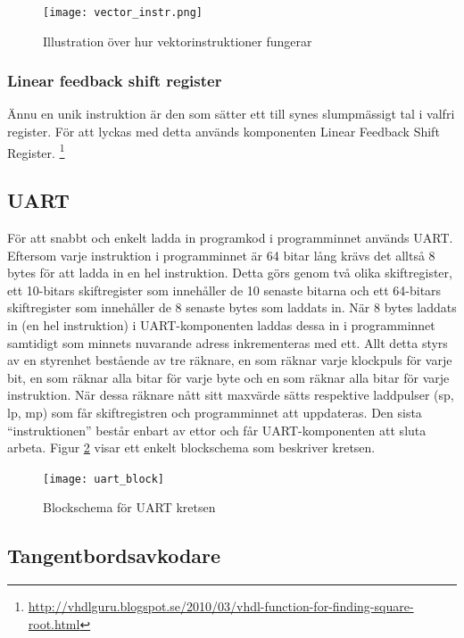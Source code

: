 \documentclass[a4paper]{article}
\begin{document}
    \begin{figure}[H]
        \centering
        \texttt{[image: vector\_instr.png]}
        \caption{Illustration över hur vektorinstruktioner fungerar}
        \label{fig:vector_instr}
    \end{figure}

    \subsubsection{Linear feedback shift register}
    Ännu en unik instruktion är den som sätter ett till synes slumpmässigt tal i valfri 
	register. För att lyckas med detta används komponenten Linear Feedback Shift Register.
    \footnote{\url{http://vhdlguru.blogspot.se/2010/03/vhdl-function-for-finding-square-root.html}}

    \subsection{UART}
    För att snabbt och enkelt ladda in programkod i programminnet används UART.
    Eftersom varje instruktion i programminnet är 64 bitar lång krävs det alltså 8
    bytes för att ladda in en hel instruktion. Detta görs genom två olika
    skiftregister, ett 10-bitars skiftregister som innehåller de 10 senaste bitarna
    och ett 64-bitars skiftregister som innehåller de 8 senaste bytes som laddats
    in. När 8 bytes laddats in (en hel instruktion) i UART-komponenten laddas dessa
    in i programminnet samtidigt som minnets nuvarande adress inkrementeras med ett.
    Allt detta styrs av en styrenhet bestående av tre räknare, en som räknar varje
    klockpuls för varje bit, en som räknar alla bitar för varje byte och en som
    räknar alla bitar för varje instruktion. När dessa räknare nått sitt maxvärde
    sätts respektive laddpulser (sp, lp, mp) som får skiftregistren och
    programminnet att uppdateras. Den sista “instruktionen” består enbart av ettor
    och får UART-komponenten att sluta arbeta. Figur \ref{fig:uart_block} visar ett enkelt blockschema
    som beskriver kretsen. 

    \begin{figure}[H]
        \centering
        \texttt{[image: uart\_block]}
        \caption{Blockschema för UART kretsen}
        \label{fig:uart_block}
    \end{figure}



    \subsection{Tangentbordsavkodare}
\end{document}
